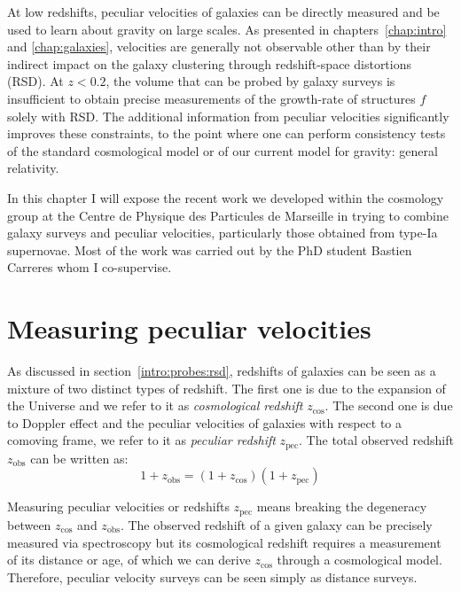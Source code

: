 \chaptertoc{}

\vspace{1em}


At low redshifts, peculiar velocities of galaxies can be directly measured 
and be used to learn about gravity on large scales. 
As presented in chapters~\ref{chap:intro} and \ref{chap:galaxies}, velocities 
are generally not observable other than by their indirect impact on the 
galaxy clustering through redshift-space distortions (RSD).
At $z<0.2$, the volume that can be probed by galaxy surveys is insufficient to obtain 
precise measurements of the growth-rate of structures $f$ solely with RSD. 
The additional information from peculiar velocities
significantly improves these constraints, to the point where one 
can perform consistency tests of the standard cosmological model or of our current 
model for gravity: general relativity. 

In this chapter I will expose the recent work we developed within the 
cosmology group at the Centre de Physique des Particules de Marseille 
in trying to combine galaxy surveys and peculiar velocities, 
particularly those obtained from type-Ia supernovae. Most of the work 
was carried out by the PhD student Bastien Carreres whom I co-supervise. 




\section{Measuring peculiar velocities}
\label{velocities:measuring}

As discussed in section~\ref{intro:probes:rsd}, 
redshifts of galaxies can be seen as a mixture of two distinct types of redshift. 
The first one is due to the expansion of the Universe and we refer to it as 
\emph{cosmological redshift} $z_\text{cos}$. The second one is due to Doppler effect and the peculiar 
velocities of galaxies with respect to a comoving frame, we refer to it as \emph{peculiar redshift} $z_\text{pec}$.
The total observed redshift $z_\text{obs}$ can be written as: 
\begin{equation}
    1+ z_\text{obs} = (1+z_\text{cos})(1+z_\text{pec})
\end{equation}

Measuring peculiar velocities or redshifts $z_\text{pec}$ means 
breaking the degeneracy between $z_\text{cos}$ and $z_\text{obs}$. 
The observed redshift of a given galaxy can be precisely measured via spectroscopy 
but its cosmological redshift requires a measurement of its distance or age, 
of which we can derive $z_\text{cos}$ through a cosmological model.
Therefore, peculiar velocity surveys can be seen simply as distance surveys.


